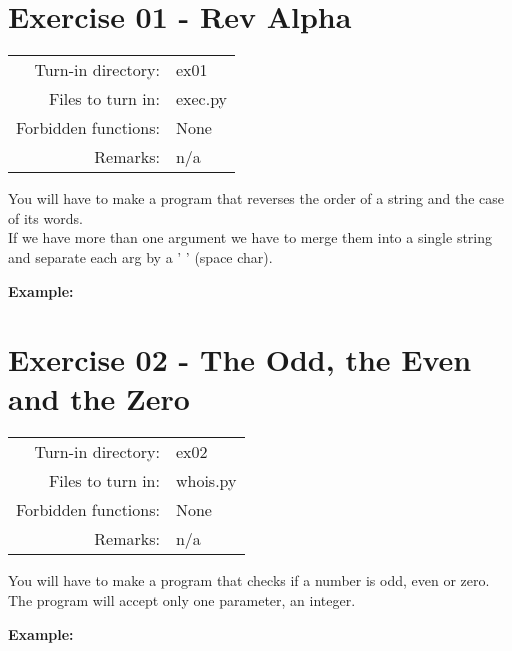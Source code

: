 \documentclass[]{article}
\newenvironment{Shaded}{\begin{snugshade}}{\end{snugshade}}
\newcommand{\NormalTok}[1]{\textcolor[rgb]{0.81,0.81,0.76}{#1}}
\begin{document}
\clearpage

\hypertarget{exercise-01---rev-alpha-1}{%
\section{Exercise 01 - Rev Alpha}\label{exercise-01---rev-alpha-1}}

\begin{longtable}[]{@{}rl@{}}
\toprule
\endhead
Turn-in directory: & ex01\tabularnewline
Files to turn in: & exec.py\tabularnewline
Forbidden functions: & None\tabularnewline
Remarks: & n/a\tabularnewline
\bottomrule
\end{longtable}

You will have to make a program that reverses the order of a string and
the case of its words.\\
If we have more than one argument we have to merge them into a single
string and separate each arg by a ' ' (space char).

\textbf{Example:}

\begin{Shaded}
\end{Shaded}

\clearpage

\hypertarget{exercise-02---the-odd-the-even-and-the-zero-1}{%
\section{Exercise 02 - The Odd, the Even and the
Zero}\label{exercise-02---the-odd-the-even-and-the-zero-1}}

\begin{longtable}[]{@{}rl@{}}
\toprule
\endhead
Turn-in directory: & ex02\tabularnewline
Files to turn in: & whois.py\tabularnewline
Forbidden functions: & None\tabularnewline
Remarks: & n/a\tabularnewline
\bottomrule
\end{longtable}

You will have to make a program that checks if a number is odd, even or
zero.\\
The program will accept only one parameter, an integer.

\textbf{Example:}
\end{document}

